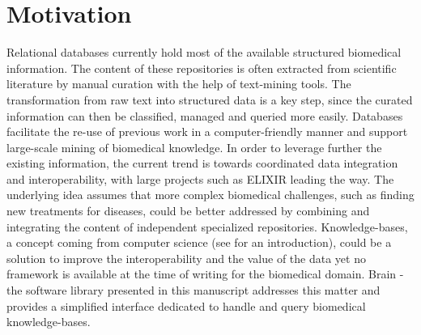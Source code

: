 \documentclass{bioinfo}
\begin{document}
\section{Motivation}
Relational databases currently hold most of the available structured biomedical information. The content of these repositories is often
extracted from scientific literature by manual curation with the help of text-mining tools. The transformation from raw text into
structured data is a key step, since the curated information can then be classified, managed and queried more easily. Databases facilitate
the re-use of previous work in a computer-friendly manner and support large-scale mining of
biomedical knowledge. In order to leverage further 
the existing information, the current trend is towards coordinated data integration and interoperability, with large projects such as 
ELIXIR \citep{Crosswell2012} leading the way.
The underlying idea assumes that more complex biomedical challenges, such as finding new treatments for diseases, could be better 
addressed by combining  and integrating the content of independent specialized repositories. 
Knowledge-bases, a concept coming from computer science (see \citealp{Krotzsch2012} for an introduction), 
could be a solution to improve the interoperability and the value of the data yet no framework is available at the time of writing for 
the biomedical domain. Brain - the software library presented in this manuscript addresses this matter and provides a simplified 
interface dedicated to handle and query biomedical knowledge-bases.
\end{document}
